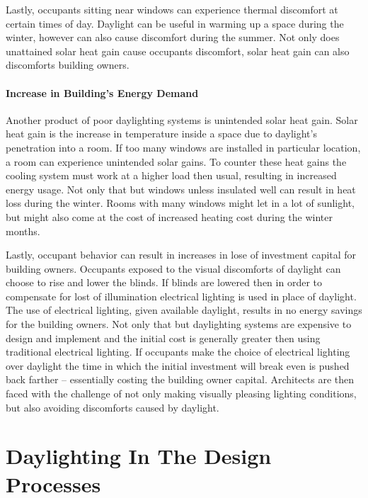     Lastly, occupants sitting near windows can experience thermal discomfort at certain times of day.
    Daylight can be useful in warming up a space during the winter, however can also cause discomfort during the summer.
    Not only does unattained solar heat gain cause occupants discomfort, solar heat gain can also discomforts building owners.

    \paragraph{Increase in Building's Energy Demand}
    
    Another product of poor daylighting systems is unintended solar heat gain. Solar heat gain is the increase in temperature inside a space due to daylight's penetration into a room. 
    If too many windows are installed in particular location, a room can experience unintended solar gains.
    To counter these heat gains the cooling system must work at a higher load then usual, resulting in increased energy usage.
    Not only that but windows unless insulated well can result in heat loss during the winter.
    Rooms with many windows might let in a lot of sunlight, but might also come at the cost of increased heating cost during the winter months.

    Lastly, occupant behavior can result in increases in lose of investment capital for building owners.
    Occupants exposed to the visual discomforts of daylight can choose to rise and lower the blinds.
    If blinds are lowered then in order to compensate for lost of illumination electrical lighting is used in place of daylight.
    The use of electrical lighting, given available daylight, results in no energy savings for the building owners.
    Not only that but daylighting systems are expensive to design and implement and the initial cost is generally greater then using traditional electrical lighting.
    If occupants make the choice of electrical lighting over daylight the time in which the initial investment will break even is pushed back farther -- essentially costing the building owner capital.
    Architects are then faced with the challenge of not only making visually pleasing lighting conditions, but also avoiding discomforts caused by daylight.

\section{Daylighting In The Design Processes}


